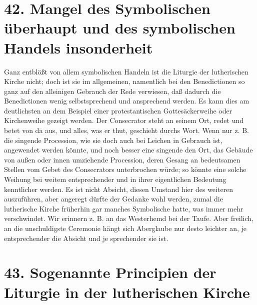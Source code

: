 \section[42. Mangel des Symbolischen]{42. Mangel des Symbolischen überhaupt und des symbolischen Handels insonderheit}

Ganz entblößt von allem symbolischen Handeln ist die Liturgie der lutherischen Kirche nicht; doch ist sie im allgemeinen, namentlich bei den Benedictionen so ganz auf den alleinigen Gebrauch der Rede verwiesen, daß dadurch die Benedictionen wenig selbstsprechend und ansprechend werden. Es kann dies
am deutlichsten an dem Beispiel einer protestantischen Gottesäckerweihe oder Kirchenweihe gezeigt werden. Der Consecrator steht an seinem Ort, redet und betet von da aus, und alles, was er thut, geschieht durchs Wort. Wenn nur z. B. die singende Procession, wie sie doch auch bei Leichen in Gebrauch ist, angewendet werden könnte, und noch besser eine singende den Ort, das Gebäude von außen oder innen umziehende Procession, deren Gesang an bedeutsamen Stellen vom Gebet des Consecrators unterbrochen würde; so könnte eine solche Weihung bei weitem entsprechender und in ihrer eigentlichen Bedeutung kenntlicher werden. Es ist nicht Absicht, diesen Umstand hier des weiteren auszuführen, aber angeregt dürfte der Gedanke wohl werden, zumal die lutherische Kirche früherhin gar manches Symbolische hatte, was immer mehr verschwindet. Wir erinnern z. B. an das Westerhemd bei der Taufe. Aber freilich, an die unschuldigste Ceremonie hängt sich Aberglaube nur desto leichter an, je entsprechender die Absicht und je sprechender sie ist.

\section[43. Sogenannte Principien der Liturgie]{43. Sogenannte Principien der Liturgie in der lutherischen Kirche}

